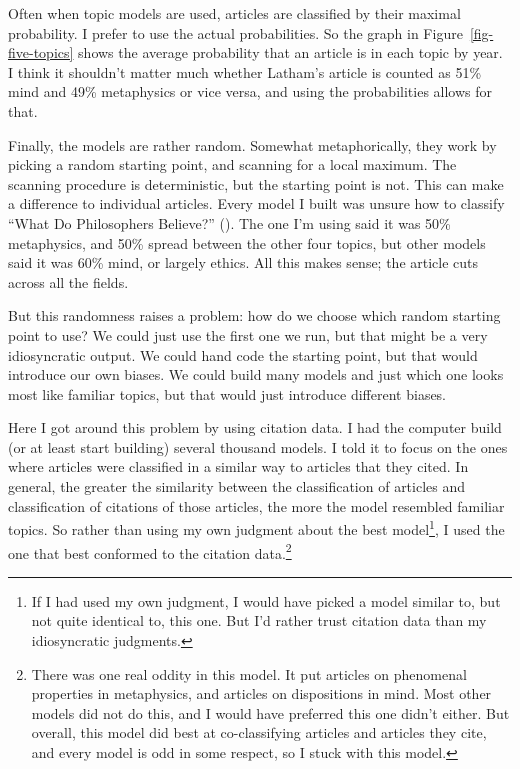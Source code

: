 \documentclass[
  10pt,
  letterpaper,
  DIV=11,
  numbers=noendperiod,
  twoside]{scrartcl}
\begin{document}
Often when topic models are used, articles are classified by their
maximal probability. I prefer to use the actual probabilities. So the
graph in Figure~\ref{fig-five-topics} shows the average probability that
an article is in each topic by year. I think it shouldn't matter much
whether Latham's article is counted as 51\% mind and 49\% metaphysics or
vice versa, and using the probabilities allows for that.

Finally, the models are rather random. Somewhat metaphorically, they
work by picking a random starting point, and scanning for a local
maximum. The scanning procedure is deterministic, but the starting point
is not. This can make a difference to individual articles. Every model I
built was unsure how to classify ``What Do Philosophers Believe?''
(). The one
I'm using said it was 50\% metaphysics, and 50\% spread between the
other four topics, but other models said it was 60\% mind, or largely
ethics. All this makes sense; the article cuts across all the fields.

But this randomness raises a problem: how do we choose which random
starting point to use? We could just use the first one we run, but that
might be a very idiosyncratic output. We could hand code the starting
point, but that would introduce our own biases. We could build many
models and just which one looks most like familiar topics, but that
would just introduce different biases.

Here I got around this problem by using citation data. I had the
computer build (or at least start building) several thousand models. I
told it to focus on the ones where articles were classified in a similar
way to articles that they cited. In general, the greater the similarity
between the classification of articles and classification of citations
of those articles, the more the model resembled familiar topics. So
rather than using my own judgment about the best model\footnote{If I had
  used my own judgment, I would have picked a model similar to, but not
  quite identical to, this one. But I'd rather trust citation data than
  my idiosyncratic judgments.}, I used the one that best conformed to
the citation data.\footnote{There was one real oddity in this model. It
  put articles on phenomenal properties in metaphysics, and articles on
  dispositions in mind. Most other models did not do this, and I would
  have preferred this one didn't either. But overall, this model did
  best at co-classifying articles and articles they cite, and every
  model is odd in some respect, so I stuck with this model.}
\end{document}
